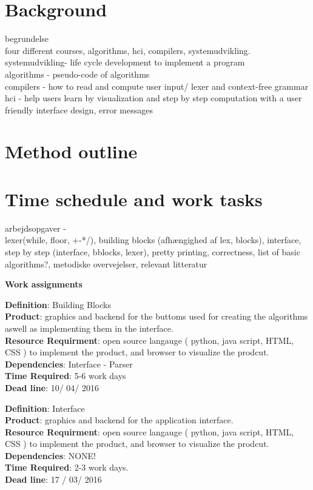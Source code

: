 \documentclass[11pt]{article}
\begin{document}
\section{Background}
begrundelse\\
four different courses, algorithms, hci, compilers, systemudvikling.\\
systemudvikling- life cycle development to implement a program\\
algorithms - pseudo-code of algorithms\\
compilers - how to read and compute user input/ lexer and context-free grammar\\
hci - help users learn by visualization and step by step computation with a user friendly interface design, error messages
\section{Method outline}
\section{Time schedule and work tasks}
arbejdsopgaver -\\
lexer(while, floor, +-*/), building blocks (afhængighed af lex, blocks), interface, step by step (interface, bblocks, lexer), pretty printing, correctness, list of basic algorithms?, metodiske overvejelser, relevant litteratur\\
\noindent\makebox[\linewidth]{\rule{\paperwidth}{0.4pt}}
\begin{center}\textbf{Work assignments}\end{center}
\noindent\makebox[\linewidth]{\rule{\paperwidth}{0.4pt}}

\textbf{Definition}: Building Blocks \\
\textbf{Product}: graphics and backend for the buttoms used for creating the algorithms aswell as implementing them in the interface.\\
\textbf{Resource Requirment}: open source langauge ( python, java script, HTML, CSS ) to implement the product, and browser to visualize the prodcut. \\
\textbf{Dependencies}: Interface - Parser\\
\textbf{Time Required}: 5-6 work days\\
\textbf{Dead line}: 10/ 04/ 2016\\
\noindent\makebox[\linewidth]{\rule{\paperwidth}{0.4pt}}

\textbf{Definition}: Interface\\
\textbf{Product}: graphics and backend for the application interface.\\
\textbf{Resource Requirment}: open source langauge ( python, java script, HTML, CSS ) to implement the product, and browser to visualize the prodcut. \\
\textbf{Dependencies}: NONE!\\
\textbf{Time Required}: 2-3 work days.\\
\textbf{Dead line}: 17 / 03/ 2016\\
\noindent\makebox[\linewidth]{\rule{\paperwidth}{0.4pt}}
\end{document}
